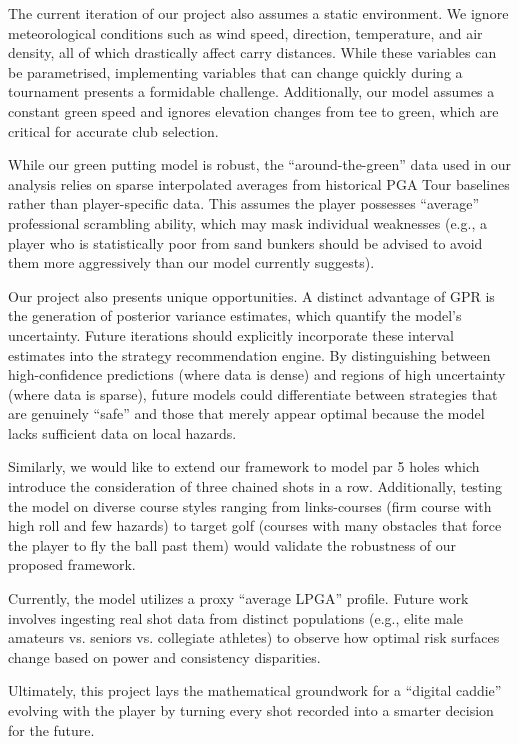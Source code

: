 \documentclass[11pt, letterpaper]{article}
\begin{document}
The current iteration of our project also assumes a static environment. We ignore meteorological conditions such as wind speed, direction, temperature, and air density, all of which drastically affect carry distances. While these variables can be parametrised, implementing variables that can change quickly during a tournament presents a formidable challenge. Additionally, our model assumes a constant green speed and ignores elevation changes from tee to green, which are critical for accurate club selection.

While our green putting model is robust, the ``around-the-green'' data used in our analysis relies on sparse interpolated averages from historical PGA Tour baselines rather than player-specific data. This assumes the player possesses ``average'' professional scrambling ability, which may mask individual weaknesses (e.g., a player who is statistically poor from sand bunkers should be advised to avoid them more aggressively than our model currently suggests).

Our project also presents unique opportunities. A distinct advantage of GPR is the generation of posterior variance estimates, which quantify the model's uncertainty. Future iterations should explicitly incorporate these interval estimates into the strategy recommendation engine. By distinguishing between high-confidence predictions (where data is dense) and regions of high uncertainty (where data is sparse), future models could differentiate between strategies that are genuinely ``safe'' and those that merely appear optimal because the model lacks sufficient data on local hazards.

Similarly, we would like to extend our framework to model par 5 holes which introduce the consideration of three chained shots in a row. Additionally, testing the model on diverse course styles ranging from links-courses (firm course with high roll and few hazards) to target golf (courses with many obstacles that force the player to fly the ball past them) would validate the robustness of our proposed framework.

Currently, the model utilizes a proxy ``average LPGA'' profile. Future work involves ingesting real shot data from distinct populations (e.g., elite male amateurs vs. seniors vs. collegiate athletes) to observe how optimal risk surfaces change based on power and consistency disparities.

Ultimately, this project lays the mathematical groundwork for a ``digital caddie'' evolving with the player by turning every shot recorded into a smarter decision for the future.
\end{document}
